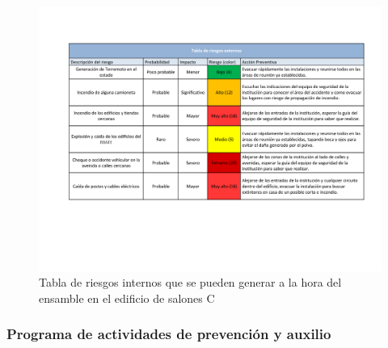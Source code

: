      \begin{figure}[H]
        \centering
        \includegraphics[trim = {20mm 80mm 10mm 20mm},clip,scale=0.35]{19/Img/riesgosExt.pdf}
        \caption{Tabla de riesgos internos que se pueden generar a la hora del ensamble en el edificio de salones C}
        \label{fig:riesgosExt}
    \end{figure}
     
    \subsubsection{Programa de actividades de prevención y auxilio}

